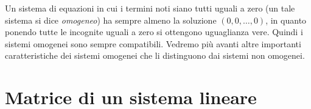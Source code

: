 \begin{oss}
  \label{oss:eqlinematrici1}
  Un sistema di equazioni in cui i termini noti siano tutti uguali a zero
  (un tale sistema si dice \textit{omogeneo}) ha sempre almeno la
  soluzione $(0,0,\dots,0)$, in quanto ponendo tutte le incognite uguali
  a zero si ottengono uguaglianza vere. Quindi i sistemi omogenei sono
  sempre compatibili. Vedremo più avanti altre importanti caratteristiche
  dei sistemi omogenei che li distinguono dai sistemi non omogenei.
\end{oss}

\section{Matrice di un sistema lineare}
\label{sec:matricediunsistlineare}

